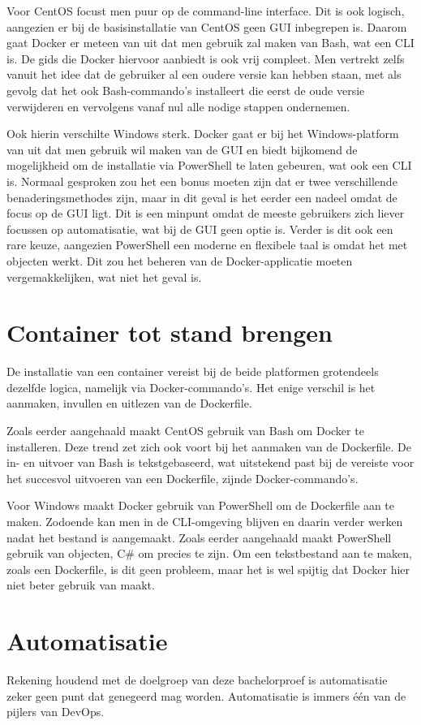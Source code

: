 Voor CentOS focust men puur op de command-line interface. Dit is ook logisch, aangezien er bij de basisinstallatie van CentOS geen GUI inbegrepen is. Daarom gaat Docker er meteen van uit dat men gebruik zal maken van Bash, wat een CLI is. De gids die Docker hiervoor aanbiedt is ook vrij compleet. Men vertrekt zelfs vanuit het idee dat de gebruiker al een oudere versie kan hebben staan, met als gevolg dat het ook Bash-commando's installeert die eerst de oude versie verwijderen en vervolgens vanaf nul alle nodige stappen ondernemen.

Ook hierin verschilte Windows sterk. Docker gaat er bij het Windows-platform van uit dat men gebruik wil maken van de GUI en biedt bijkomend de mogelijkheid om de installatie via PowerShell te laten gebeuren, wat ook een CLI is. Normaal gesproken zou het een bonus moeten zijn dat er twee verschillende benaderingsmethodes zijn, maar in dit geval is het eerder een nadeel omdat de focus op de GUI ligt. Dit is een minpunt omdat de meeste gebruikers zich liever focussen op automatisatie, wat bij de GUI geen optie is. Verder is dit ook een rare keuze, aangezien PowerShell een moderne en flexibele taal is omdat het met objecten werkt. Dit zou het beheren van de Docker-applicatie moeten vergemakkelijken, wat niet het geval is.

\section{Container tot stand brengen}
De installatie van een container vereist bij de beide platformen grotendeels dezelfde logica, namelijk via Docker-commando's. Het enige verschil is het aanmaken, invullen en uitlezen van de Dockerfile.

Zoals eerder aangehaald maakt CentOS gebruik van Bash om Docker te installeren. Deze trend zet zich ook voort bij het aanmaken van de Dockerfile. De in- en uitvoer van Bash is tekstgebaseerd, wat uitstekend past bij de vereiste voor het succesvol uitvoeren van een Dockerfile, zijnde Docker-commando's.

Voor Windows maakt Docker gebruik van PowerShell om de Dockerfile aan te maken. Zodoende kan men in de CLI-omgeving blijven en daarin verder werken nadat het bestand is aangemaakt. Zoals eerder aangehaald maakt PowerShell gebruik van objecten, C\# om precies te zijn. Om een tekstbestand aan te maken, zoals een Dockerfile, is dit geen probleem, maar het is wel spijtig dat Docker hier niet beter gebruik van maakt.

\section{Automatisatie}
Rekening houdend met de doelgroep van deze bachelorproef is automatisatie zeker geen punt dat genegeerd mag worden. Automatisatie is immers één van de pijlers van DevOps.

